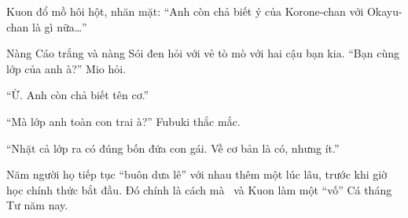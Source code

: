 \documentclass[../main.tex]{subfiles}
\begin{document}
Kuon đổ mồ hôi hột, nhăn mặt: ``Anh còn chả biết ý của Korone-chan với Okayu-chan là gì nữa\dots''

Nàng Cáo trắng và nàng Sói đen hỏi với vẻ tò mò với hai cậu bạn kia. ``Bạn cùng lớp của anh à?'' Mio hỏi.

``Ừ. Anh còn chả biết tên cơ.''

``Mà lớp anh toàn con trai à?'' Fubuki thắc mắc.

``Nhặt cả lớp ra có đúng bốn đứa con gái. Về cơ bản là có, nhưng ít.''

Năm người họ tiếp tục ``buôn dưa lê'' với nhau thêm một lúc lâu, trước khi giờ học chính thức bắt đầu. Đó chính là cách mà \hll\ và Kuon làm một ``vố'' Cá tháng Tư năm nay.
\end{document}
